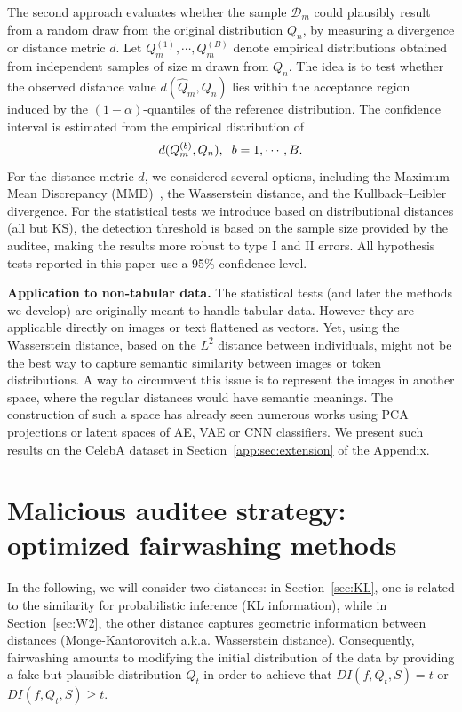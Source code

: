\documentclass[runningheads, orivec]{llncs}
\begin{document}
The second approach evaluates whether the sample $\mathcal{D}_{m}$ could plausibly result from a random draw from the original distribution $Q_n$, by measuring a divergence or distance metric $d$. Let $Q_m^{(1)},\cdots,Q_m^{(B)}$ denote empirical distributions obtained from independent samples of size m drawn from $Q_n$. The idea is to test whether the observed distance value $d(\widehat{Q}_{m}, Q_n)$ lies within the acceptance region induced by the $(1-\alpha)$-quantiles of the reference distribution. The confidence interval is estimated from the empirical distribution of 
\begin{equation}
    d(Q_m^{(b)},Q_n), \text{\hspace{0.2cm}} b = 1,\cdots,B.
\end{equation}
For the distance metric $d$, we considered several options, including the Maximum Mean Discrepancy (MMD)~\cite{JMLR:v13:gretton12a}, the Wasserstein distance, and the Kullback–Leibler divergence. 
For the statistical tests we introduce based on distributional distances (all but KS), the detection threshold is based on the sample size provided by the auditee, making the results more robust to type I and II errors. All hypothesis tests reported in this paper use a 95\% confidence level.

\begin{remark} \textbf{Application to non-tabular data.}
The statistical tests (and later the methods we develop) are originally meant to handle tabular data. However they are applicable directly on images or text flattened as vectors. Yet, using the Wasserstein distance, based on the $L^2$ distance between individuals, might not be the best way to capture semantic similarity between images or token distributions. A way to circumvent this issue is to represent the images in another space, where the regular distances would have semantic meanings. The construction of such a space has already seen numerous works using PCA projections or latent spaces of AE, VAE or CNN classifiers. We present such results on the CelebA dataset \cite{liu2015faceattributes} in Section~\ref{app:sec:extension} of the Appendix.
\end{remark}

\section{Malicious auditee strategy: optimized fairwashing methods}
\label{sec:methods}
In the following, we will consider two distances: in Section~\ref{sec:KL}, one is related to the similarity for probabilistic inference (KL information), while in Section~\ref{sec:W2}, the other distance captures geometric information between distances (Monge-Kantorovitch a.k.a. Wasserstein distance). Consequently, fairwashing amounts to modifying the initial distribution of the data by providing a fake but plausible distribution $Q_t$ in order to achieve that $DI(f,Q_t,S) = t$ or $DI(f,Q_t,S) \geq t$. 
\end{document}
